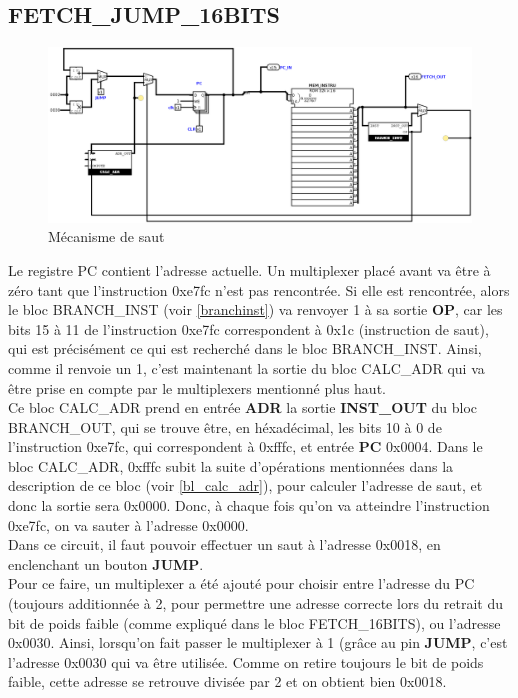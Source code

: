 \documentclass[a4paper]{article} %
\begin{document}
\subsection{FETCH\_JUMP\_16BITS}
\begin{figure}[H]
    \centering
    \includegraphics[width=1\textwidth]{src/FETCH_JUMP.png}
    \caption{Mécanisme de saut}
    \label{fetch_jump}
\end{figure}
Le registre PC contient l'adresse actuelle. Un multiplexer placé avant va être à zéro tant que l'instruction 0xe7fc n'est pas rencontrée. Si elle est rencontrée, alors le bloc BRANCH\_INST (voir \ref{branchinst}) va renvoyer 1 à sa sortie \textbf{OP}, car les bits 15 à 11 de l'instruction 0xe7fc correspondent à 0x1c (instruction de saut), qui est précisément ce qui est recherché dans le bloc BRANCH\_INST. Ainsi, comme il renvoie un 1, c'est maintenant la sortie du bloc CALC\_ADR qui va être prise en compte par le multiplexers mentionné plus haut. \\
Ce bloc CALC\_ADR prend en entrée \textbf{ADR} la sortie \textbf{INST\_OUT} du bloc BRANCH\_OUT, qui se trouve être, en héxadécimal, les bits 10 à 0 de l'instruction 0xe7fc, qui correspondent à 0xfffc, et entrée \textbf{PC} 0x0004. Dans le bloc CALC\_ADR, 0xfffc subit la suite d'opérations mentionnées dans la description de ce bloc (voir \ref{bl_calc_adr}), pour calculer l'adresse de saut, et donc la sortie sera 0x0000. Donc, à chaque fois qu'on va atteindre l'instruction 0xe7fc, on va sauter à l'adresse 0x0000.
\\
Dans ce circuit, il faut pouvoir effectuer un saut à l'adresse 0x0018, en enclenchant un bouton \textbf{JUMP}. 
\\Pour ce faire, un multiplexer a été ajouté pour choisir entre l'adresse du PC (toujours additionnée à 2, pour permettre une adresse correcte lors du retrait du bit de poids faible (comme expliqué dans le bloc FETCH\_16BITS), ou l'adresse 0x0030. Ainsi, lorsqu'on fait passer le multiplexer à 1 (grâce au pin \textbf{JUMP}, c'est l'adresse 0x0030 qui va être utilisée. Comme on retire toujours le bit de poids faible, cette adresse se retrouve divisée par 2 et on obtient bien 0x0018.
\pagebreak
\end{document}
